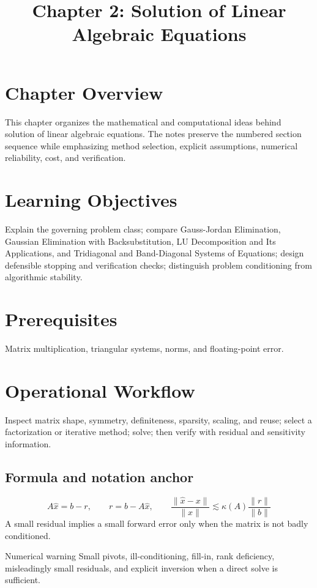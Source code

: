 \documentclass[10pt,letterpaper]{article}
\title{Chapter 2: Solution of Linear Algebraic Equations}
\author{}
\date{}
\begin{document}
\maketitle

\section*{Chapter Overview}
This chapter organizes the mathematical and computational ideas behind solution of linear algebraic equations. The notes preserve the numbered section sequence while emphasizing method selection, explicit assumptions, numerical reliability, cost, and verification.

\section*{Learning Objectives}
Explain the governing problem class; compare Gauss-Jordan Elimination, Gaussian Elimination with Backsubstitution, LU Decomposition and Its Applications, and Tridiagonal and Band-Diagonal Systems of Equations; design defensible stopping and verification checks; distinguish problem conditioning from algorithmic stability.

\section*{Prerequisites}
Matrix multiplication, triangular systems, norms, and floating-point error.

\section*{Operational Workflow}
Inspect matrix shape, symmetry, definiteness, sparsity, scaling, and reuse; select a factorization or iterative method; solve; then verify with residual and sensitivity information.

\subsection*{Formula and notation anchor}
\[
A\widehat{x}=b-r,\qquad r=b-A\widehat{x},\qquad \frac{\|\widehat{x}-x\|}{\|x\|}\lesssim \kappa(A)\frac{\|r\|}{\|b\|}
\]
A small residual implies a small forward error only when the matrix is not badly conditioned.

\begin{warnbox}{Numerical warning}
Small pivots, ill-conditioning, fill-in, rank deficiency, misleadingly small residuals, and explicit inversion when a direct solve is sufficient.
\end{warnbox}
\end{document}
